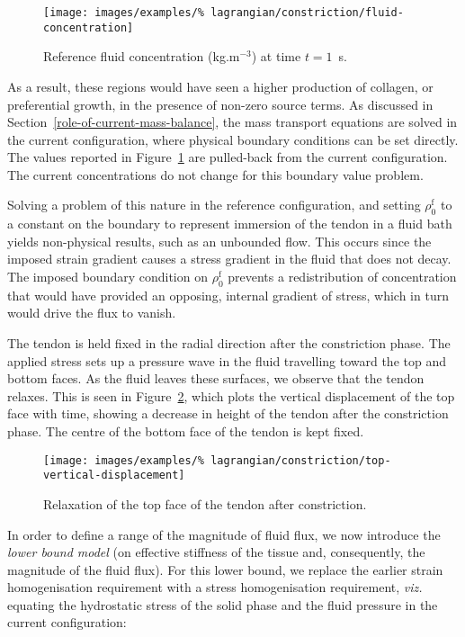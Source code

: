 \begin{figure}[!hpt]
  \centering
  \texttt{[image: images/examples/\%
    lagrangian/constriction/fluid-concentration]}
  \caption{Reference fluid concentration (kg.m$^{-3}$) at time
    $t=1$~s.}
  \label{eg2conc}
\end{figure}

As a result, these regions would have seen a higher production of
collagen, or preferential growth, in the presence of non-zero source
terms. As discussed in Section~\ref{role-of-current-mass-balance}, the
mass transport equations are solved in the current configuration,
where physical boundary conditions can be set directly. The values
reported in Figure~\ref{eg2conc} are pulled-back from the current
configuration. The current concentrations do not change for this
boundary value problem.

Solving a problem of this nature in the reference configuration, and
setting $\rho_0^\mathrm{f}$ to a constant on the boundary to represent
immersion of the tendon in a fluid bath yields non-physical results,
such as an unbounded flow. This occurs since the imposed strain
gradient causes a stress gradient in the fluid that does not
decay. The imposed boundary condition on $\rho_0^\mathrm{f}$ prevents
a redistribution of concentration that would have provided an
opposing, internal gradient of stress, which in turn would drive the
flux to vanish.

The tendon is held fixed in the radial direction after the
constriction phase. The applied stress sets up a pressure wave in the
fluid travelling toward the top and bottom faces. As the fluid leaves
these surfaces, we observe that the tendon relaxes. This is seen in
Figure~\ref{topdisp}, which plots the vertical displacement of the top
face with time, showing a decrease in height of the tendon after the
constriction phase. The centre of the bottom face of the tendon is
kept fixed.

\begin{figure}[!t]
  \centering
  \texttt{[image: images/examples/\%
    lagrangian/constriction/top-vertical-displacement]}
  \caption{Relaxation of the top face of the tendon after
    constriction.}
  \label{topdisp}
\end{figure}

In order to define a range of the magnitude of fluid flux, we now
introduce the {\em lower bound model} (on effective stiffness of the
tissue and, consequently, the magnitude of the fluid flux). For this
lower bound, we replace the earlier strain homogenisation requirement
with a stress homogenisation requirement, {\em viz.} equating the
hydrostatic stress of the solid phase and the fluid pressure in the
current configuration:

